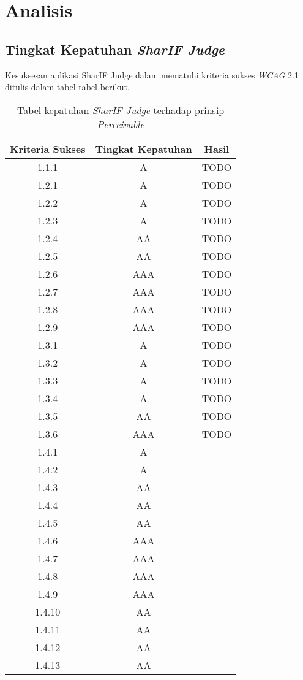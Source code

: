 \chapter{Analisis}
\label{chap:analisis}

\section{Tingkat Kepatuhan \textit{SharIF Judge}}
\label{sec:kepatuhan_sharif_judge_terhadap_wcag_2.1}
Kesuksesan aplikasi SharIF Judge dalam mematuhi kriteria sukses \textit{WCAG} 2.1 ditulis dalam tabel-tabel berikut.

\begin{table}[H]
	\centering
	\caption{Tabel kepatuhan \textit{SharIF Judge} terhadap prinsip \textit{Perceivable}}
	\label{tab:kepatuhan_sharif_judge_perceivable}
	\begin{tabular}{|c|c|c|}
		\hline
		Kriteria Sukses & Tingkat Kepatuhan & Hasil \\
		\hline
		1.1.1 & A & TODO \\
		1.2.1 & A & TODO \\
		1.2.2 & A & TODO \\
		1.2.3 & A & TODO \\
		1.2.4 & AA & TODO \\
		1.2.5 & AA & TODO \\
		1.2.6 & AAA & TODO \\
		1.2.7 & AAA & TODO \\
		1.2.8 & AAA & TODO \\
		1.2.9 & AAA & TODO \\
		1.3.1 & A & TODO \\
		1.3.2 & A & TODO \\
		1.3.3 & A & TODO \\
		1.3.4 & A & TODO \\
		1.3.5 & AA & TODO \\
		1.3.6 & AAA & TODO \\
		1.4.1 & A & \\
		1.4.2 & A & \\
		1.4.3 & AA & \\
		1.4.4 & AA & \\
		1.4.5 & AA & \\
		1.4.6 & AAA & \\
		1.4.7 & AAA & \\
		1.4.8 & AAA & \\
		1.4.9 & AAA & \\
		1.4.10 & AA & \\
		1.4.11 & AA & \\
		1.4.12 & AA & \\
		1.4.13 & AA & \\
		\hline
	\end{tabular}
\end{table}

